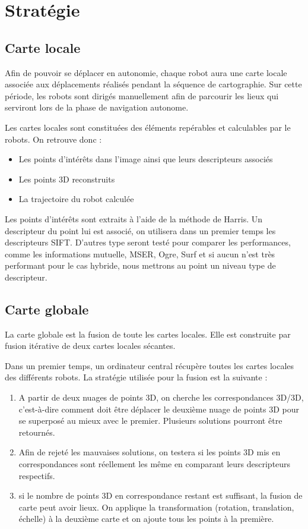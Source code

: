 \section{Stratégie}
\label{sec:strategie}

\subsection{Carte locale}

Afin de pouvoir se déplacer en autonomie, chaque robot aura une carte locale associée aux déplacements réalisés pendant la séquence de cartographie.
Sur cette période, les robots sont dirigés manuellement afin de parcourir les lieux qui serviront lors de la phase de navigation autonome.

Les cartes locales sont constituées des éléments repérables et calculables par le robots.
On retrouve donc :
\begin{itemize}
\item Les points d'intérêts dans l'image ainsi que leurs descripteurs associés
\item Les points 3D reconstruits
\item La trajectoire du robot calculée
\end{itemize}

Les points d'intérêts sont extraits à l'aide de la méthode de Harris.
Un descripteur du point lui est associé, on utilisera dans un premier temps les descripteurs SIFT.
D'autres type  seront testé pour comparer les performances, comme les informations mutuelle, MSER, Ogre, Surf et si aucun n'est très performant pour le cas hybride, nous mettrons au point un niveau type de descripteur.


\subsection{Carte globale}

La carte globale est la fusion de toute les cartes locales.
Elle est construite par fusion itérative de deux cartes locales sécantes.

Dans un premier temps, un ordinateur central récupère toutes les cartes locales des différents robots.
La stratégie utilisée pour la fusion est la suivante :
\begin{enumerate}
\item A partir de deux nuages de points 3D, on cherche les correspondances 3D/3D, c'est-à-dire comment doit être déplacer le deuxième nuage de points 3D pour se superposé au mieux avec le premier.
Plusieurs solutions pourront être retournés.
\item Afin de rejeté les mauvaises solutions, on testera si les points 3D mis en correspondances sont réellement les même en comparant leurs descripteurs respectifs.
\item si le nombre de points 3D en correspondance restant est suffisant, la fusion de carte peut avoir lieux.
On applique la transformation (rotation, translation, échelle) à la deuxième carte et on ajoute tous les points à la première.
\end{enumerate}

